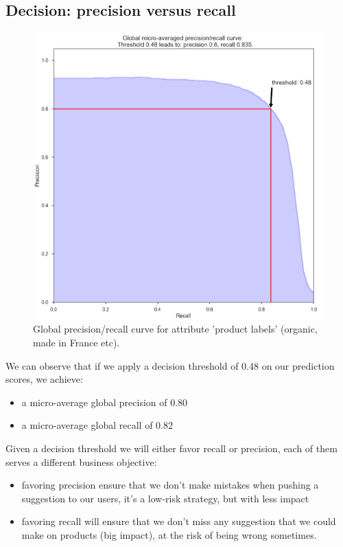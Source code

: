 \subsection{Decision: precision versus recall}

\begin{figure}[H]
\centering
\includegraphics[scale=0.4]{./images/calibration/islabeledby_global_curve.png}
\caption{Global precision/recall curve for attribute 'product labels' (organic, made in France etc).}
\end{figure}

We can observe that if we apply a decision threshold of 0.48 on our prediction scores, we achieve:
\begin{itemize}
	\item a micro-average global precision of 0.80
	\item a micro-average global recall of 0.82
\end{itemize}

Given a decision threshold we will either favor recall or precision, each of them serves a different business objective:
\begin{itemize}
	\item favoring precision ensure that we don't make mistakes when pushing a suggestion to our users, it's a low-risk strategy, but with less impact
	\item favoring recall will ensure that we don't miss any suggestion that we could make on products (big impact), at the risk of being wrong sometimes.
\end{itemize}

